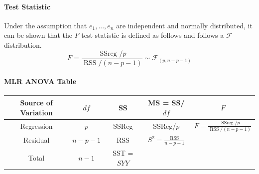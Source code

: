\documentclass[11pt]{article}
\begin{document}
\paragraph{Test Statistic} Under the assumption that $e_1,...,e_n$ are independent and normally distributed, it can be shown that the $F$ test statistic is defined as follows and follows a $\mathcal{F}$ distribution.
\begin{equation*}
    F=\frac{\text { SSreg } / p}{\operatorname{RSS} /(n-p-1)} {\sim} \mathcal{F}_{(p, n-p-1)}
\end{equation*}
\paragraph{MLR ANOVA Table}
\begin{center}
    \begin{tabular}{|c||c|c|c|c|}
        \hline
        Source of Variation & $df$ & SS & MS = SS/$df$ & $F$ \\ \hline
        Regression & $p$ & SSReg & SSReg/$p$ & $F=\frac{\text { SSreg } / p}{\operatorname{RSS} /(n-p-1)}$ \\ \hline
        Residual & $n-p-1$ & RSS & $S^2 = \frac{\text{RSS}}{n-p-1}$ & \\ \hline
        Total & $n-1$ & SST = $SYY$ & & \\ \hline
    \end{tabular}
\end{center}
\end{document}

